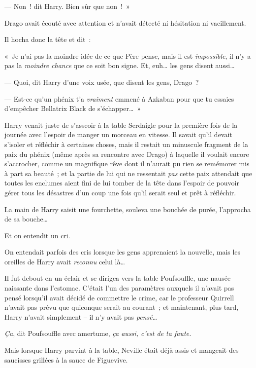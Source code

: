 --- Non~! dit Harry. Bien sûr que non~!~»

Drago avait écouté avec attention et n'avait détecté ni hésitation ni vacillement.

Il hocha donc la tête et dit~:

«~Je n'ai pas la moindre idée de ce que Père pense, mais il est \emph{impossible}, il n'y a pas la \emph{moindre chance} que ce soit bon signe. Et, euh… les gens disent aussi…

--- Quoi, dit Harry d'une voix usée, que disent les gens, Drago~?

--- Est-ce qu'un phénix t'a \emph{vraiment} emmené à Azkaban pour que tu essaies d'empêcher Bellatrix Black de s'échapper…~»


Harry venait juste de s'asseoir à la table Serdaigle pour la première fois de la journée avec l'espoir de manger un morceau en vitesse. Il savait qu'il devait s'isoler et réfléchir à certaines choses, mais il restait un minuscule fragment de la paix du phénix (même après sa rencontre avec Drago) à laquelle il voulait encore s'accrocher, comme un magnifique rêve dont il n'aurait pu rien se remémorer mis à part sa beauté~; et la partie de lui qui ne ressentait \emph{pas} cette paix attendait que toutes les enclumes aient fini de lui tomber de la tête dans l'espoir de pouvoir gérer tous les désastres d'un coup une fois qu'il serait seul et prêt à réfléchir.

La main de Harry saisit une fourchette, souleva une bouchée de purée, l'approcha de sa bouche…

Et on entendit un cri.

On entendait parfois des cris lorsque les gens apprenaient la nouvelle, mais les oreilles de Harry avait \emph{reconnu} celui là…

Il fut debout en un éclair et se dirigea vers la table Poufsouffle, une nausée naissante dans l'estomac. C'était l'un des paramètres auxquels il n'avait pas pensé lorsqu'il avait décidé de commettre le crime, car le professeur Quirrell n'avait pas prévu que quiconque serait au courant~; et maintenant, plus tard, Harry n'avait simplement -- il n'y avait pas \emph{pensé}…

\emph{Ça}, dit Poufsouffle avec amertume, \emph{ça aussi, c'est de ta faute.}

Mais lorsque Harry parvint à la table, Neville était déjà assis et mangeait des saucisses grillées à la sauce de Figuevive.

